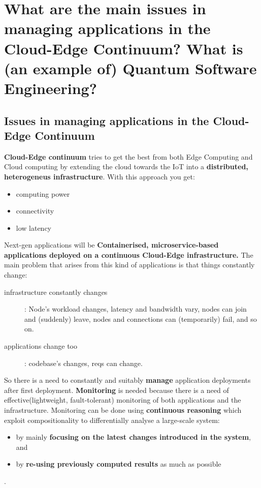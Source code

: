 \section{What are the main issues in managing applications in the Cloud-Edge Continuum? What is (an example of) Quantum Software Engineering?}
\subsection{Issues in managing applications in the Cloud-Edge Continuum}
\textbf{Cloud-Edge continuum} tries to get the best from both Edge Computing and Cloud computing by extending the cloud towards the IoT into a \textbf{distributed, heterogeneus infrastructure}. With this approach you get:
\begin{itemize}
   \item computing power
   \item connectivity
   \item low latency
\end{itemize}
Next-gen applications will be \textbf{Containerised, microservice-based applications deployed on a continuous Cloud-Edge infrastructure.} \nl
The main problem that arises from this kind of applications is that things constantly change:
\begin{description}
   \item[infrastructure constantly changes]: Node's workload changes, latency and bandwidth vary, nodes can join and (suddenly) leave, nodes and connections can (temporarily) fail, and so on.
   \item[applications change too]: codebase's changes, reqs can change.
\end{description}
So there is a need to constantly and suitably \textbf{manage} application deployments after first deployment. \nl
\textbf{Monitoring} is needed because there is a need of effective(lightweight, fault-tolerant) monitoring of both applications and the infrastructure. \nl
Monitoring can be done using \textbf{continuous reasoning} which exploit compositionality to differentially analyse a large-scale system:
\begin{itemize}
   \item by mainly \textbf{focusing on the latest changes introduced in the system}, and
   \item by \textbf{re-using previously computed results} as much as possible
\end{itemize}
.
